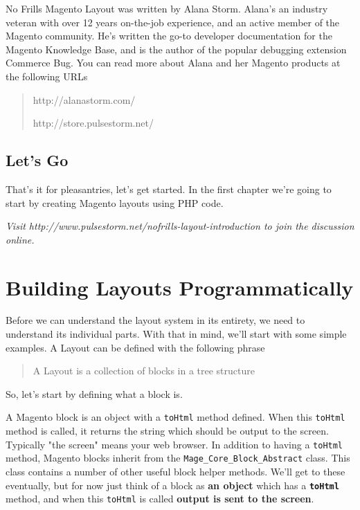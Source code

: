 \documentclass[oneside]{book}
\begin{document}
No Frills Magento Layout was written by Alana Storm.  Alana's an industry veteran with over 12 years on-the-job experience, and an active member of the Magento community.  He's written the go-to developer documentation for the Magento Knowledge Base, and is the author of the popular debugging extension Commerce Bug.  You can read more about Alana and her Magento products at the following URLs

\begin{quote}
http://alanastorm.com/

  http://store.pulsestorm.net/
\end{quote}

\section{Let's Go}

That's it for pleasantries, let's get started.  In the first chapter we're going to start by creating Magento layouts using PHP code.

\emph{Visit http://www.pulsestorm.net/nofrills-layout-introduction to join the discussion online.}
\chapter{Building Layouts Programmatically}
Before we can understand the layout system in its entirety, we need to understand its individual parts. With that in mind, we'll start with some simple examples.  A Layout can be defined with the following phrase

\begin{quote}
A Layout is a collection of blocks in a tree structure
\end{quote}

So, let's start by defining what a block is.

A Magento block is an object with a \footnotesize\texttt{toHtml} \normalsize  method defined.  When this \footnotesize\texttt{toHtml} \normalsize  method is called, it returns the string which should be output to the screen. Typically "the screen" means your web browser.  In addition to having a \footnotesize\texttt{toHtml} \normalsize  method, Magento blocks inherit from the \footnotesize\texttt{Mage\_Core\_Block\_Abstract} \normalsize  class. This class contains a number of other useful block helper methods.  We'll get to these eventually, but for now just think of a block as \textbf{an object} which has a \textbf{\footnotesize\texttt{toHtml} \normalsize } method, and when this \footnotesize\texttt{toHtml} \normalsize  is called \textbf{output is sent to the screen}.
\end{document}
